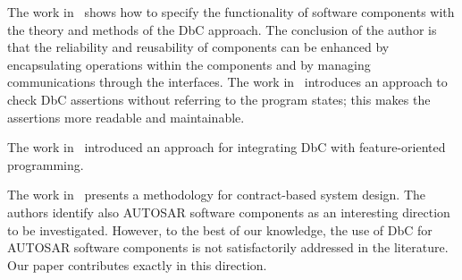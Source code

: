 The work in~\cite{ii5} shows %
how to specify the functionality of software components with the theory and methods of the DbC approach. %
The conclusion of the author is that the reliability and reusability of components can be enhanced by encapsulating operations 
 within the components and by managing communications %
 through the interfaces. %
 The work in~\cite{ii4} introduces an approach %
 to %
 check DbC assertions without referring to the program states; this makes the assertions more readable and maintainable.


The work in~\cite{ii3} introduced an approach for integrating DbC with feature-oriented programming. %

The work in~\cite{ContractsSystemsDesign} presents a methodology for contract-based system design. The authors identify also AUTOSAR software components as an interesting direction to be investigated. 
However, to the best of our knowledge, the use of DbC for AUTOSAR software components is not %
satisfactorily addressed in the literature. 
Our paper contributes exactly in this direction.

